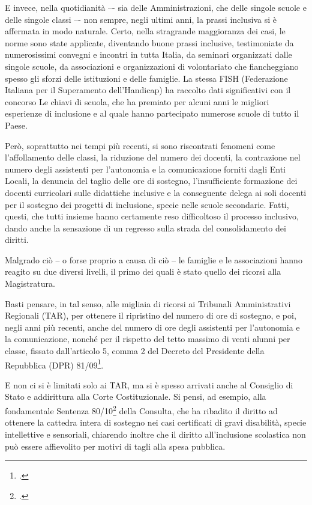 E invece, nella quotidianità –- sia delle Amministrazioni, che delle singole scuole e delle singole classi –- non sempre, negli ultimi anni, la prassi inclusiva si è affermata in modo naturale. Certo, nella stragrande maggioranza dei casi, le norme sono state applicate, diventando buone prassi inclusive, testimoniate da numerosissimi convegni e incontri in tutta Italia, da seminari organizzati dalle singole scuole, da associazioni e organizzazioni di volontariato che fiancheggiano spesso gli sforzi delle istituzioni e delle famiglie. La stessa FISH (Federazione Italiana per il Superamento dell'Handicap) ha raccolto dati significativi con il concorso Le chiavi di scuola, che ha premiato per alcuni anni le migliori esperienze di inclusione e al quale hanno partecipato numerose scuole di tutto il Paese.

Però, soprattutto nei tempi più recenti, si sono riscontrati fenomeni come l'affollamento delle classi, la riduzione del numero dei docenti, la contrazione nel numero degli assistenti per l'autonomia e la comunicazione forniti dagli Enti Locali, la denuncia del taglio delle ore di sostegno, l'insufficiente formazione dei docenti curricolari sulle didattiche inclusive e la conseguente delega ai soli docenti per il sostegno dei progetti di inclusione, specie nelle scuole secondarie. Fatti, questi, che tutti insieme hanno certamente reso difficoltoso il processo inclusivo, dando anche la sensazione di un regresso sulla strada del consolidamento dei diritti.

Malgrado ciò – o forse proprio a causa di ciò – le famiglie e le associazioni hanno reagito su due diversi livelli, il primo dei quali è stato quello dei ricorsi alla Magistratura.

Basti pensare, in tal senso, alle migliaia di ricorsi ai Tribunali Amministrativi Regionali (TAR), per ottenere il ripristino del numero di ore di sostegno, e poi, negli anni più recenti, anche del numero di ore degli assistenti per l'autonomia e la comunicazione, nonché per il rispetto del tetto massimo di venti alunni per classe, fissato dall'articolo 5, comma 2 del Decreto del Presidente della Repubblica (DPR) 81/09\footcite{DPR_81_2009}.

E non ci si è limitati solo ai TAR, ma si è spesso arrivati anche al Consiglio di Stato e addirittura alla Corte Costituzionale. Si pensi, ad esempio, alla fondamentale Sentenza 80/10\footcite{SCC_80_2010} della Consulta, che ha ribadito il diritto ad ottenere la cattedra intera di sostegno nei casi certificati di gravi disabilità, specie intellettive e sensoriali, chiarendo inoltre che il diritto all'inclusione scolastica non può essere affievolito per motivi di tagli alla spesa pubblica.

